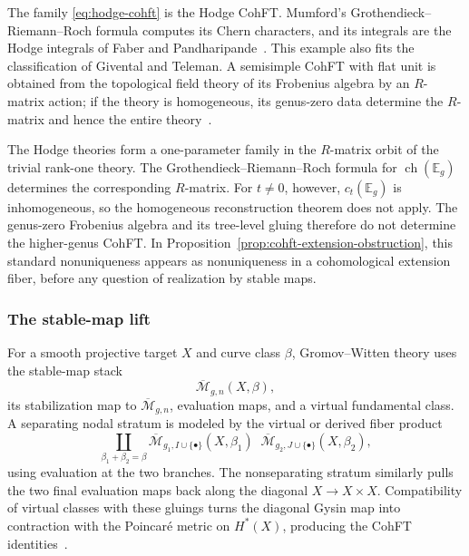 \documentclass[11pt,letterpaper,twoside]{article}
\theoremstyle{plain}
\theoremstyle{definition}
\theoremstyle{remark}
\let\cite\citep
\begin{document}
The family \eqref{eq:hodge-cohft} is the Hodge CohFT.  Mumford's Grothendieck--Riemann--Roch formula computes its Chern characters, and its integrals are the Hodge integrals of Faber and Pandharipande~\cite{mumford1983,faberpandharipande2000}.  This example also fits the classification of Givental and Teleman.  A semisimple CohFT with flat unit is obtained from the topological field theory of its Frobenius algebra by an \(R\)-matrix action; if the theory is homogeneous, its genus-zero data determine the \(R\)-matrix and hence the entire theory~\cite{givental2001,teleman2012}.

The Hodge theories form a one-parameter family in the \(R\)-matrix orbit of the trivial rank-one theory.  The Grothendieck--Riemann--Roch formula for \(\operatorname{ch}(\mathbb E_g)\) determines the corresponding \(R\)-matrix.  For \(t\neq0\), however, \(c_t(\mathbb E_g)\) is inhomogeneous, so the homogeneous reconstruction theorem does not apply.  The genus-zero Frobenius algebra and its tree-level gluing therefore do not determine the higher-genus CohFT.  In Proposition~\ref{prop:cohft-extension-obstruction}, this standard nonuniqueness appears as nonuniqueness in a cohomological extension fiber, before any question of realization by stable maps.

\subsubsection{The stable-map lift}

For a smooth projective target \(X\) and curve class \(\beta\), Gromov--Witten theory uses the stable-map stack
\[
 \overline{\mathcal M}_{g,n}(X,\beta),
\]
its stabilization map to \(\overline{\mathcal M}_{g,n}\), evaluation maps, and a virtual fundamental class.  A separating nodal stratum is modeled by the virtual or derived fiber product
\begin{equation}\label{eq:stable-map-separating}
 \coprod_{\beta_1+\beta_2=\beta}
 \overline{\mathcal M}_{g_1,I\cup\{\bullet\}}(X,\beta_1)
 \mathop{\times_X^{\mathbf R}}
 \overline{\mathcal M}_{g_2,J\cup\{\bullet\}}(X,\beta_2),
\end{equation}
using evaluation at the two branches.  The nonseparating stratum similarly pulls the two final evaluation maps back along the diagonal \(X\to X\times X\).  Compatibility of virtual classes with these gluings turns the diagonal Gysin map into contraction with the Poincar\'e metric on \(H^*(X)\), producing the CohFT identities~\cite{kontsevichmanin1994,behrendmanin1996,behrend1997}.
\end{document}
